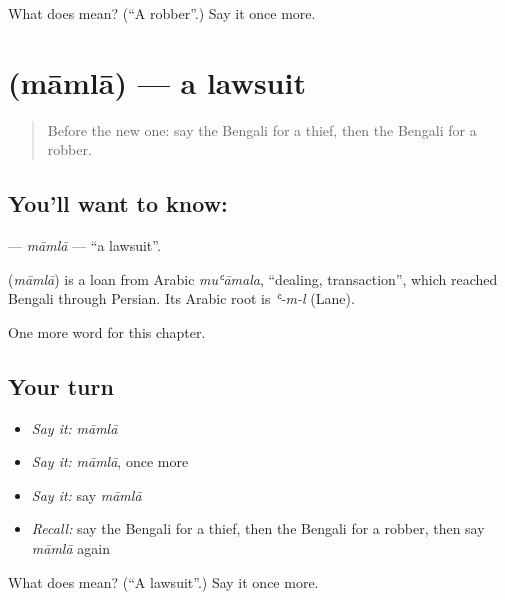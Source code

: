 \begin{tcolorbox}[breakable,colback=teal!4,colframe=teal!35!black,title={Before you move on}]
What does  mean? (\textquotedblleft{}A robber\textquotedblright{}.) Say it once more.
\end{tcolorbox}
\section[\texorpdfstring{\bn{মামলা} (māmlā)}{মামলা (māmlā)}]{ (māmlā) — a lawsuit}

\label{lesson:BN-C202-mamla}



\begin{quote}
Before the new one: say the Bengali for a thief, then the Bengali for a robber.
\end{quote}

\subsection*{You'll want to know: }
\textbf{} — \emph{māmlā} — \textquotedblleft{}a lawsuit\textquotedblright{}.

\begin{cousinweb}
\textbf{} (\emph{māmlā}) is a loan from Arabic \emph{muʿāmala}, \textquotedblleft{}dealing, transaction\textquotedblright{}, which reached Bengali through Persian. Its Arabic root is \emph{ʿ-m-l} (Lane).
\end{cousinweb}

\begin{grammarlens}[title={What you've built}]
One more word for this chapter.
\end{grammarlens}

\subsection*{Your turn}
\begin{itemize}
\raggedright
  \item \emph{Say it:} \emph{māmlā}
  \item \emph{Say it:} \emph{māmlā}, once more
  \item \emph{Say it:} say \emph{māmlā}
  \item \emph{Recall:} say the Bengali for a thief, then the Bengali for a robber, then say \emph{māmlā} again
\end{itemize}

\begin{tcolorbox}[breakable,colback=teal!4,colframe=teal!35!black,title={Before you move on}]
What does  mean? (\textquotedblleft{}A lawsuit\textquotedblright{}.) Say it once more.
\end{tcolorbox}
